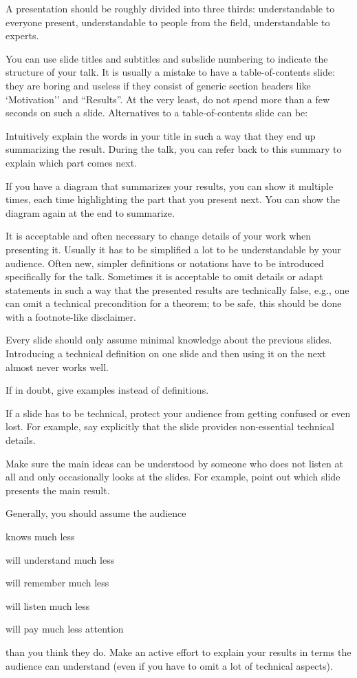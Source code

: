 \documentclass[12pt]{article}
\begin{document}
A presentation should be roughly divided into three thirds: understandable to everyone present, understandable to people from the field, understandable to experts.
\medskip

You can use slide titles and subtitles and subslide numbering to indicate the structure of your talk.
It is usually a mistake to have a table-of-contents slide: they are boring and useless if they consist of generic section headers like `Motivation'' and ``Results''.
At the very least, do not spend more than a few seconds on such a slide.
Alternatives to a table-of-contents slide can be:
\begin{compactitem}
\item Intuitively explain the words in your title in such a way that they end up summarizing the result.
During the talk, you can refer back to this summary to explain which part comes next.
\item If you have a diagram that summarizes your results, you can show it multiple times, each time highlighting the part that you present next.
You can show the diagram again at the end to summarize.
\end{compactitem}
\medskip

It is acceptable and often necessary to change details of your work when presenting it.
Usually it has to be simplified a lot to be understandable by your audience.
Often new, simpler definitions or notations have to be introduced specifically for the talk.
Sometimes it is acceptable to omit details or adapt statements in such a way that the presented results are technically false, e.g., one can omit a technical precondition for a theorem; to be safe, this should be done with a footnote-like disclaimer.
\medskip

Every slide should only assume minimal knowledge about the previous slides.
Introducing a technical definition on one slide and then using it on the next almost never works well.
\medskip

If in doubt, give examples instead of definitions.
\medskip

If a slide has to be technical, protect your audience from getting confused or even lost.
For example, say explicitly that the slide provides non-essential technical details.
\medskip

Make sure the main ideas can be understood by someone who does not listen at all and only occasionally looks at the slides.
For example, point out which slide presents the main result.
\medskip

Generally, you should assume the audience
\begin{compactitem}
\item knows much less
\item will understand much less
\item will remember much less
\item will listen much less
\item will pay much less attention
\end{compactitem}
than you think they do.
Make an active effort to explain your results in terms the audience can understand (even if you have to omit a lot of technical aspects).
\medskip
\end{document}
